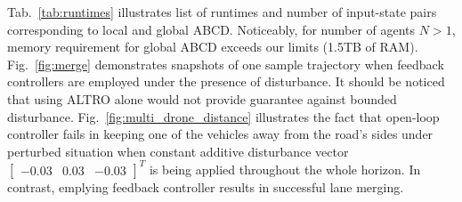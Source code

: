 Tab.~\ref{tab:runtimes} illustrates list of runtimes and number of input-state pairs corresponding to local and global ABCD. Noticeably, for number of agents $N>1$, memory requirement for global ABCD exceeds our limits (1.5TB of RAM). Fig.~\ref{fig:merge} demonstrates snapshots of one sample trajectory when feedback controllers are employed under the presence of disturbance. It should be noticed that using ALTRO alone would not provide guarantee against bounded disturbance.
Fig.~\ref{fig:multi_drone_distance} illustrates the fact that open-loop controller fails in keeping one of the vehicles away from the road's sides under perturbed situation when constant additive disturbance vector $\begin{bmatrix}-0.03 &0.03&-0.03\end{bmatrix}^T$ is being applied throughout the whole horizon. In contrast, emplying feedback controller results in successful lane merging. %





%



